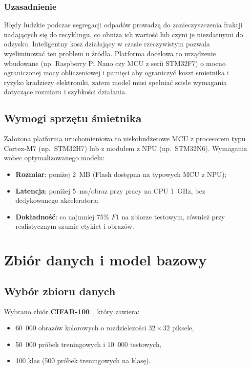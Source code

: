 \documentclass[12pt,twocolumn]{article}
\begin{document}
\subsubsection*{Uzasadnienie}
Błędy ludzkie podczas segregacji odpadów prowadzą do zanieczyszczenia frakcji
nadających się do recyklingu, co obniża ich wartość lub czyni je niezdatnymi
do odzysku.
Inteligentny kosz działający w czasie rzeczywistym pozwala wyeliminować ten
problem u źródła.
Platforma docelowa to urządzenie wbudowane (np. Raspberry Pi Nano czy MCU z serii STM32F7) o mocno ograniczonej mocy obliczeniowej i
pamięci aby ograniczyć koszt smietnika i ryzyko kradzieży elektroniki, zatem model musi spełniać scisłe wymagania dotyczące
rozmiaru i szybkości działania.

\subsection{Wymogi sprzętu śmietnika}

Założona platforma uruchomieniowa to niskobudżetowe MCU z procesorem typu Cortex-M7
(np.\ STM32H7) lub z modułem z NPU (np.\ STM32N6). Wymagania wobec optymalizowanego modelu:
\begin{itemize}
  \item \textbf{Rozmiar}: poniżej 2~MB (Flash dostępna na typowych MCU
        z NPU);
  \item \textbf{Latencja}: poniżej 5~ms/obraz przy pracy na CPU
        1~GHz, bez dedykowanego akceleratora;
  \item \textbf{Dokładność}: co najmniej 75\% $F1$ na zbiorze testowym,
        również przy realistycznym szumie etykiet i obrazów.
\end{itemize}

\section{Zbiór danych i model bazowy}
\label{sec:etap2}

\subsection{Wybór zbioru danych}

Wybrano zbiór \textbf{CIFAR-100}~\cite{krizhevsky2009learning}, który zawiera:
\begin{itemize}
  \item 60~000 obrazów kolorowych o rozdzielczości $32 \times 32$ piksele,
  \item 50~000 próbek treningowych i 10~000 testowych,
  \item 100 klas (500 próbek treningowych na klasę).
\end{itemize}
\end{document}
